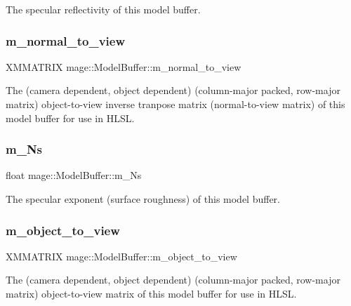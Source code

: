 The specular reflectivity of this model buffer. \hypertarget{structmage_1_1_model_buffer_ae9cfca57417c88d28362d979d6d37fa8}{}\label{structmage_1_1_model_buffer_ae9cfca57417c88d28362d979d6d37fa8} 
\subsubsection{\texorpdfstring{m\+\_\+normal\+\_\+to\+\_\+view}{m\_normal\_to\_view}}
{\footnotesize\ttfamily X\+M\+M\+A\+T\+R\+IX mage\+::\+Model\+Buffer\+::m\+\_\+normal\+\_\+to\+\_\+view}

The (camera dependent, object dependent) (column-\/major packed, row-\/major matrix) object-\/to-\/view inverse tranpose matrix (normal-\/to-\/view matrix) of this model buffer for use in H\+L\+SL. \hypertarget{structmage_1_1_model_buffer_aae6440e415cbda57a8cc2f16e928934b}{}\label{structmage_1_1_model_buffer_aae6440e415cbda57a8cc2f16e928934b} 
\subsubsection{\texorpdfstring{m\+\_\+\+Ns}{m\_Ns}}
{\footnotesize\ttfamily float mage\+::\+Model\+Buffer\+::m\+\_\+\+Ns}

The specular exponent (surface roughness) of this model buffer. \hypertarget{structmage_1_1_model_buffer_a2b4b94cd38c5d276aea4a7d6cc9edbba}{}\label{structmage_1_1_model_buffer_a2b4b94cd38c5d276aea4a7d6cc9edbba} 
\subsubsection{\texorpdfstring{m\+\_\+object\+\_\+to\+\_\+view}{m\_object\_to\_view}}
{\footnotesize\ttfamily X\+M\+M\+A\+T\+R\+IX mage\+::\+Model\+Buffer\+::m\+\_\+object\+\_\+to\+\_\+view}

The (camera dependent, object dependent) (column-\/major packed, row-\/major matrix) object-\/to-\/view matrix of this model buffer for use in H\+L\+SL. \hypertarget{structmage_1_1_model_buffer_a22d0996efc06c121ce2e0b88235d5650}{}\label{structmage_1_1_model_buffer_a22d0996efc06c121ce2e0b88235d5650} 
